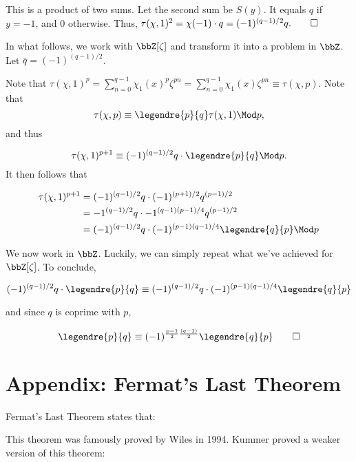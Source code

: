 \documentclass[a4paper, 12pt,oneside,openany]{book}
\begin{document}
This is a product of two sums. Let the second sum be $S(y)$. It equals $q$ if $y=-1$, and $0$ otherwise. Thus, $\tau(\chi, 1)^2 = \chi(-1) \cdot q = (-1)^{(q-1)/2}q. \qed$

In what follows, we work with $\bbZ[\zeta]$ and transform it into a problem in $\bbZ$. Let $\bar{q}= (-1)^{(q-1)/2}$. 

Note that $\tau(\chi, 1)^p = \sum\limits_{n=0}^{q-1} \chi_1(x)^p \zeta^{pn} = \sum\limits_{n=0}^{q-1} \chi_1(x) \zeta^{pn} \equiv \tau(\chi, p)$. Note that $$\tau(\chi, p) \equiv \legendre{p}{q} \tau(\chi, 1) \Mod p,$$ and thus

$$\tau(\chi, 1)^{p+1} \equiv (-1)^{(q-1)/2}q \cdot \legendre{p}{q} \Mod p.$$ It then follows that 

\begin{align*}
	\tau(\chi, 1)^{p+1} &= (-1)^{(q-1)/2}q \cdot  (-1)^{(p+1)/2} q^{(p-1)/2} \\ &= -1^{(q-1)/2}q \cdot -1^{(q-1)(p-1)/4} q^{(p-1)/2}\\ &= (-1)^{(q-1)/2}q \cdot (-1)^{(p-1)(q-1)/4} \legendre{q}{p} \Mod p
\end{align*} 

We now work in $\bbZ$. Luckily, we can simply repeat what we've achieved for $\bbZ[\zeta]$. To conclude, 

$$ (-1)^{(q-1)/2}q \cdot \legendre{p}{q} \\ \equiv (-1)^{(q-1)/2}q \cdot (-1)^{(p-1)(q-1)/4} \legendre{q}{p} $$

and since $q$ is coprime with $p$, 

$$\legendre{p}{q} \\ \equiv  (-1)^{\frac{p-1}{2} \frac{(q-1)}{2}} \legendre{q}{p} \qed$$

\section{Appendix: Fermat's Last Theorem}

Fermat's Last Theorem states that:


This theorem was famously proved by Wiles in 1994. Kummer proved a weaker version of this theorem:

\end{document}
